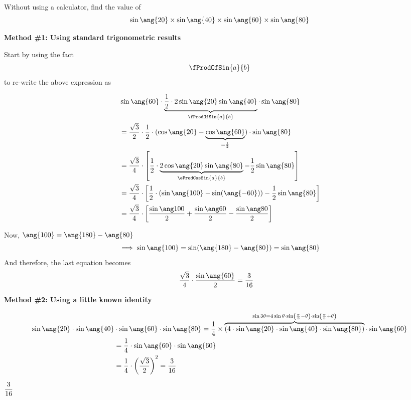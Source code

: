 


\question[4] Without using a calculator, find the value of 
\[ \sin\ang{\va}\times\sin\ang{\vb}\times\sin\ang{\vc}\times\sin\ang{\vd} \]

\watchout

\begin{solution}[\halfpage]
    \textbf{Method \#1: Using standard trigonometric results} 

    Start by using the fact 
    \[ \fProdOfSin{a}{b}\] 
    to re-write the above expression as

    \begin{align}
    	&\sin\ang{\vc}\cdot\underbrace{\dfrac{1}{2}\cdot 2\sin\ang{\va}\sin\ang{\vb}}_{\fProdOfSin{a}{b}}\cdot\sin\ang{\vd} \\
    	&= \dfrac{\sqrt{3}}{2}\cdot\dfrac{1}{2}\cdot(\cos\ang{\va}-\underbrace{\cos\ang{\vc}}_{= \frac{1}{2}})\cdot\sin\ang{\vd} \\
    	&= \dfrac{\sqrt{3}}{4}\cdot\left[\dfrac{1}{2}\cdot \underbrace{2\cos\ang{\va}\sin\ang{\vd}}
    	_{\eProdCosSin{a}{b}} - \dfrac{1}{2}\sin\ang{\vd}\right] \\
    	&= \dfrac{\sqrt{3}}{4}\cdot\left[ \dfrac{1}{2}\cdot(\sin\ang{\vg} - \sin(\ang{-\vc}))
    	-\dfrac{1}{2}\sin\ang{\vd}\right ] \\
      &= \dfrac{\sqrt{3}}{4}\cdot\left[ \dfrac{\sin\ang\vg}{2}+\dfrac{\sin\ang\vc}{2}-\dfrac{\sin\ang\vd}{2} \right]
    \end{align}

    Now, $ \ang{\vg} = \ang{180}-\ang{\vd}$ 
    \[ \implies\sin\ang{\vg} = \sin(\ang{180}-\ang{\vd}) = \sin\ang{\vd} \]
    And therefore, the last equation becomes 
    \begin{align}
    	 \dfrac{\sqrt{3}}{4}\cdot\dfrac{\sin\ang{\vc}}{2} &= \ve
    \end{align}

    \textbf{Method \#2: Using a little known identity}

    \begin{align}
       \sin\ang{\va}\cdot\sin\ang{\vb}&\cdot\sin\ang{\vc}\cdot\sin\ang{\vd} = 
       \dfrac{1}{4}\times\overbrace{(4\cdot\sin\ang{\va}\cdot\sin\ang{\vb}\cdot\sin\ang{\vd})}
       ^{\sin 3\theta = 4\sin\theta\cdot\sin\left( \frac{\pi}{3} - \theta\right)\cdot\sin\left(\frac{\pi}{3} +
        \theta\right)}\cdot\sin\ang{\vc} \\
       &= \dfrac{1}{4}\cdot\sin\ang{\vc}\cdot\sin\ang{\vc} \\
       &= \dfrac{1}{4}\cdot\left(\vf \right)^2 = \ve
    \end{align}
\end{solution}
\ifprintanswers\begin{codex}$\dfrac{3}{16}$\end{codex}\fi
